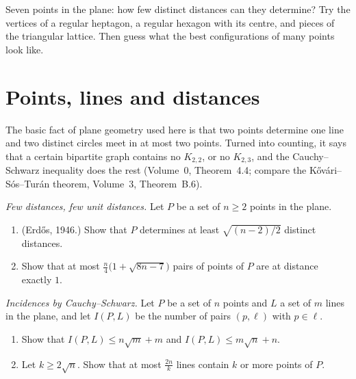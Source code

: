 \begin{think}
Seven points in the plane: how few distinct distances can they determine? Try the vertices of a regular heptagon, a regular
hexagon with its centre, and pieces of the triangular lattice. Then guess what the best configurations of many points look
like.
\end{think}

\section{Points, lines and distances}

The basic fact of plane geometry used here is that two points determine one line and two distinct circles meet in at most two
points. Turned into counting, it says that a certain bipartite graph contains no $K_{2,2}$, or no $K_{2,3}$, and the
Cauchy--Schwarz inequality does the rest (Volume~0, Theorem~4.4; compare the Kővári--Sós--Turán theorem, Volume~3, Theorem~B.6).

\begin{exercise}[$\star\star$]\label{pb:distances}
\emph{Few distances, few unit distances.} Let $P$ be a set of $n\ge2$ points in the plane.
\begin{enumerate}[label=(\alph*)]
\item (Erdős, 1946.) Show that $P$ determines at least $\sqrt{(n-2)/2}$ distinct distances.
\item Show that at most $\frac n4\bigl(1+\sqrt{8n-7}\bigr)$ pairs of points of $P$ are at distance exactly $1$.
\end{enumerate}
\end{exercise}

\begin{exercise}[$\star\star$]\label{pb:incidences}
\emph{Incidences by Cauchy--Schwarz.} Let $P$ be a set of $n$ points and $L$ a set of $m$ lines in the plane, and let $I(P,L)$ be the
number of pairs $(p,\ell)$ with $p\in\ell$.
\begin{enumerate}[label=(\alph*)]
\item Show that $I(P,L)\le n\sqrt m+m$ and $I(P,L)\le m\sqrt n+n$.
\item Let $k\ge2\sqrt n$. Show that at most $\frac{2n}k$ lines contain $k$ or more points of $P$.
\end{enumerate}
\end{exercise}

